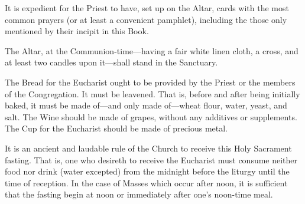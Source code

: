 \label{GeneralRubrics}
\begin{rubric}
    It is expedient for the Priest to have, set up on the Altar, cards with the most common prayers (or at least a convenient pamphlet), including the those only mentioned by their incipit in this Book.\par
\end{rubric}
\begin{rubric}
The Altar, at the Communion-time---having a fair white linen cloth, a cross, and at least two candles upon it---shall stand in the Sanctuary.
\end{rubric}
\begin{rubric}
The Bread for the Eucharist ought to be provided by the Priest or the members of the Congregation. It must be leavened. That is, before and after being initially baked, it must be made of---and only made of---wheat flour, water, yeast, and salt. The Wine should be made of grapes, without any additives or supplements. The Cup for the Eucharist should be made of precious metal.
\end{rubric}
\begin{rubric}
It is an ancient and laudable rule of the Church to receive this Holy Sacrament fasting. That is, one who desireth to receive the Eucharist must consume neither food nor drink (water excepted) from the midnight before the liturgy until the time of reception. In the case of Masses which occur after noon, it is sufficient that the fasting begin at noon or immediately after one's noon-time meal.
\end{rubric}


